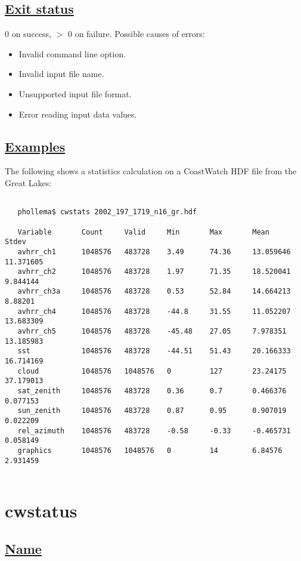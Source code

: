 \subsection*{\underline{Exit status}}


  0 on success, $>$ 0 on failure. Possible causes of errors:
\begin{itemize}
\item  Invalid command line option. 
\item  Invalid input file name. 
\item  Unsupported input file format. 
\item  Error reading input data values. 

\end{itemize}
\subsection*{\underline{Examples}}


  The following shows a statistics calculation on a CoastWatch HDF file from the Great Lakes:
\begin{verbatim}

   phollema$ cwstats 2002_197_1719_n16_gr.hdf

   Variable       Count     Valid     Min       Max       Mean       Stdev     
   avhrr_ch1      1048576   483728    3.49      74.36     13.059646  11.371605 
   avhrr_ch2      1048576   483728    1.97      71.35     18.520041  9.844144  
   avhrr_ch3a     1048576   483728    0.53      52.84     14.664213  8.88201   
   avhrr_ch4      1048576   483728    -44.8     31.55     11.052207  13.683309 
   avhrr_ch5      1048576   483728    -45.48    27.05     7.978351   13.185983 
   sst            1048576   483728    -44.51    51.43     20.166333  16.714169 
   cloud          1048576   1048576   0         127       23.24175   37.179013 
   sat_zenith     1048576   483728    0.36      0.7       0.466376   0.077153  
   sun_zenith     1048576   483728    0.87      0.95      0.907019   0.022209  
   rel_azimuth    1048576   483728    -0.58     -0.33     -0.465731  0.058149  
   graphics       1048576   1048576   0         14        6.84576    2.931459  
 
\end{verbatim}

\newpage
\section{cwstatus} \hypertarget{cwstatus}{}
\subsection*{\underline{Name}}


